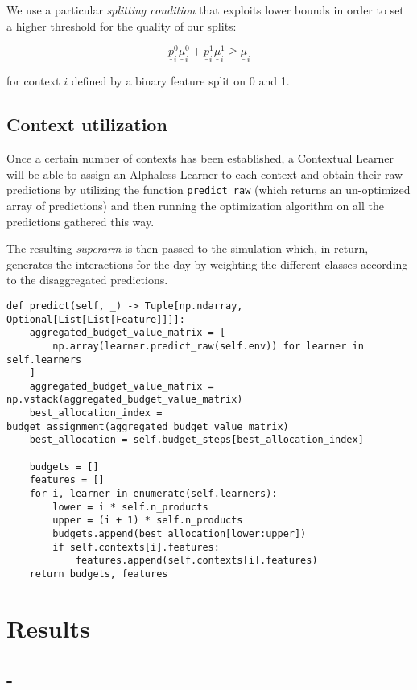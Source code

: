 We use a particular \textit{splitting condition} that exploits lower bounds in order to set a higher threshold for the quality of our splits:

\begin{Large}
	\begin{displaymath}
		\underline{p}_i^0 \underline{\mu}_i^0 + \underline{p}_i^1 \underline{\mu}_i^1 \geq \underline{\mu}_i
	\end{displaymath}
\end{Large}

for context $i$ defined by a binary feature split on 0 and 1.

\subsection{Context utilization}

Once a certain number of contexts has been established, a Contextual Learner will be able to assign an Alphaless Learner to each context and obtain their raw predictions by utilizing the function \texttt{predict\_raw} (which returns an un-optimized array of predictions) and then running the optimization algorithm on all the predictions gathered this way.

The resulting \textit{superarm} is then passed to the simulation which, in return, generates the interactions for the day by weighting the different classes according to the disaggregated predictions.

\begin{lstlisting}[style=Python]
def predict(self, _) -> Tuple[np.ndarray, Optional[List[List[Feature]]]]:
	aggregated_budget_value_matrix = [
		np.array(learner.predict_raw(self.env)) for learner in self.learners
	]
	aggregated_budget_value_matrix = np.vstack(aggregated_budget_value_matrix)
	best_allocation_index = budget_assignment(aggregated_budget_value_matrix)
	best_allocation = self.budget_steps[best_allocation_index]

	budgets = []
	features = []
	for i, learner in enumerate(self.learners):
		lower = i * self.n_products
		upper = (i + 1) * self.n_products
		budgets.append(best_allocation[lower:upper])
		if self.contexts[i].features:
			features.append(self.contexts[i].features)
	return budgets, features
\end{lstlisting}

\section{Results}
\label{sec:ctx_gen_res}

\subsection{-}
